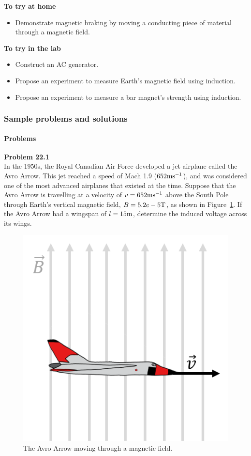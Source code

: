\begin{framed}
\textbf{To try at home}\\
\begin{itemize}
\item Demonstrate magnetic braking by moving a conducting piece of material through a magnetic field.
\end{itemize}
\end{framed}

\begin{framed}
\textbf{To try in the lab}\\
\begin{itemize}
\item Construct an AC generator.
\item Propose an experiment to measure Earth's magnetic field using induction.
\item Propose an experiment to measure a bar magnet's strength using induction.
\end{itemize}
\end{framed}

\subsubsection{Sample problems and solutions}

\paragraph{Problems}

\begin{framed}
\textbf{Problem 22.1}\\
In the 1950s, the Royal Canadian Air Force developed a jet airplane called the Avro Arrow. This jet reached a speed of Mach 1.9 ($652 {\rm ms^{ -1}}$), and was considered one of the most advanced airplanes that existed at the time. Suppose that the Avro Arrow is travelling at a velocity of $v = 652 {\rm ms^{ -1}}$ above the South Pole through Earth's vertical magnetic field, $B = 5.2e -5 {\rm T}$, as shown in Figure~\ref{fig:induction:avro}. If the Avro Arrow had a wingspan of $l = 15 {\rm m}$, determine the induced voltage across its wings.

\begin{figure}[!htbp]
\centering
\includegraphics[width=0.25\linewidth]{files/avro-2bee885122f39a9c5de989faa5ab7a4b.png}
\caption[]{The Avro Arrow moving through a magnetic field.}
\label{fig:induction:avro}
\end{figure}
\end{framed}

